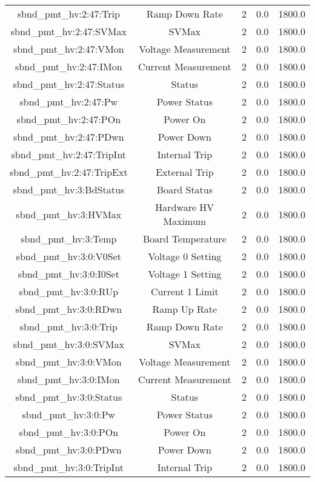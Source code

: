 \begin{center}
\begin{longtable}{c | c c c c }
sbnd\_pmt\_hv:2:47:Trip & Ramp Down Rate & 2 & 0.0 & 1800.0\\ 
sbnd\_pmt\_hv:2:47:SVMax & SVMax & 2 & 0.0 & 1800.0\\ 
sbnd\_pmt\_hv:2:47:VMon & Voltage Measurement & 2 & 0.0 & 1800.0\\ 
sbnd\_pmt\_hv:2:47:IMon & Current Measurement & 2 & 0.0 & 1800.0\\ 
sbnd\_pmt\_hv:2:47:Status & Status & 2 & 0.0 & 1800.0\\ 
sbnd\_pmt\_hv:2:47:Pw & Power Status & 2 & 0.0 & 1800.0\\ 
sbnd\_pmt\_hv:2:47:POn & Power On & 2 & 0.0 & 1800.0\\ 
sbnd\_pmt\_hv:2:47:PDwn & Power Down & 2 & 0.0 & 1800.0\\ 
sbnd\_pmt\_hv:2:47:TripInt & Internal Trip & 2 & 0.0 & 1800.0\\ 
sbnd\_pmt\_hv:2:47:TripExt & External Trip & 2 & 0.0 & 1800.0\\ 
sbnd\_pmt\_hv:3:BdStatus & Board Status & 2 & 0.0 & 1800.0\\ 
sbnd\_pmt\_hv:3:HVMax & Hardware HV Maximum & 2 & 0.0 & 1800.0\\ 
sbnd\_pmt\_hv:3:Temp & Board Temperature & 2 & 0.0 & 1800.0\\ 
sbnd\_pmt\_hv:3:0:V0Set & Voltage 0 Setting & 2 & 0.0 & 1800.0\\ 
sbnd\_pmt\_hv:3:0:I0Set & Voltage 1 Setting & 2 & 0.0 & 1800.0\\ 
sbnd\_pmt\_hv:3:0:RUp & Current 1 Limit & 2 & 0.0 & 1800.0\\ 
sbnd\_pmt\_hv:3:0:RDwn & Ramp Up Rate & 2 & 0.0 & 1800.0\\ 
sbnd\_pmt\_hv:3:0:Trip & Ramp Down Rate & 2 & 0.0 & 1800.0\\ 
sbnd\_pmt\_hv:3:0:SVMax & SVMax & 2 & 0.0 & 1800.0\\ 
sbnd\_pmt\_hv:3:0:VMon & Voltage Measurement & 2 & 0.0 & 1800.0\\ 
sbnd\_pmt\_hv:3:0:IMon & Current Measurement & 2 & 0.0 & 1800.0\\ 
sbnd\_pmt\_hv:3:0:Status & Status & 2 & 0.0 & 1800.0\\ 
sbnd\_pmt\_hv:3:0:Pw & Power Status & 2 & 0.0 & 1800.0\\ 
sbnd\_pmt\_hv:3:0:POn & Power On & 2 & 0.0 & 1800.0\\ 
sbnd\_pmt\_hv:3:0:PDwn & Power Down & 2 & 0.0 & 1800.0\\ 
sbnd\_pmt\_hv:3:0:TripInt & Internal Trip & 2 & 0.0 & 1800.0\\ 

\end{longtable}
\end{center}

